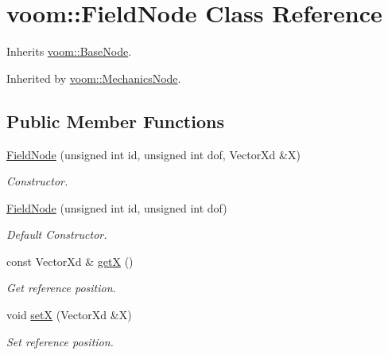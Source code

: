 \hypertarget{classvoom_1_1_field_node}{
\section{voom::FieldNode Class Reference}
\label{classvoom_1_1_field_node}
}


Inherits \hyperlink{classvoom_1_1_base_node}{voom::BaseNode}.

Inherited by \hyperlink{classvoom_1_1_mechanics_node}{voom::MechanicsNode}.\subsection*{Public Member Functions}
\begin{DoxyCompactItemize}
\item 
\hypertarget{classvoom_1_1_field_node_a0e2117eb038d94a72cc7b26f3b979fcf}{
\hyperlink{classvoom_1_1_field_node_a0e2117eb038d94a72cc7b26f3b979fcf}{FieldNode} (unsigned int id, unsigned int dof, VectorXd \&X)}
\label{classvoom_1_1_field_node_a0e2117eb038d94a72cc7b26f3b979fcf}

\begin{DoxyCompactList}\small\item\em Constructor. \item\end{DoxyCompactList}\item 
\hypertarget{classvoom_1_1_field_node_a7ee4511b01d5aee80cdfe33f7977b78a}{
\hyperlink{classvoom_1_1_field_node_a7ee4511b01d5aee80cdfe33f7977b78a}{FieldNode} (unsigned int id, unsigned int dof)}
\label{classvoom_1_1_field_node_a7ee4511b01d5aee80cdfe33f7977b78a}

\begin{DoxyCompactList}\small\item\em Default Constructor. \item\end{DoxyCompactList}\item 
\hypertarget{classvoom_1_1_field_node_a094161f2e84c28de1874b66200a327b0}{
const VectorXd \& \hyperlink{classvoom_1_1_field_node_a094161f2e84c28de1874b66200a327b0}{getX} ()}
\label{classvoom_1_1_field_node_a094161f2e84c28de1874b66200a327b0}

\begin{DoxyCompactList}\small\item\em Get reference position. \item\end{DoxyCompactList}\item 
\hypertarget{classvoom_1_1_field_node_a766de8ed257fa4db8a4bf90c6fe24f15}{
void \hyperlink{classvoom_1_1_field_node_a766de8ed257fa4db8a4bf90c6fe24f15}{setX} (VectorXd \&X)}
\label{classvoom_1_1_field_node_a766de8ed257fa4db8a4bf90c6fe24f15}

\begin{DoxyCompactList}\small\item\em Set reference position. \item\end{DoxyCompactList}\end{DoxyCompactItemize}
